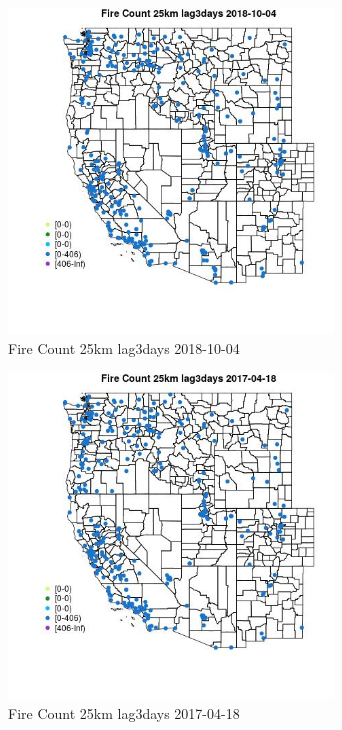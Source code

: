 \begin{figure} 
\centering  
\includegraphics[width=0.77\textwidth]{Code_Outputs/Report_ML_input_PM25_Step4_part_f_de_duplicated_aves_prioritize_24hr_obswNAs_MapObsFire_Count_25km_lag3days2018-10-04.jpg} 
\caption{\label{fig:Report_ML_input_PM25_Step4_part_f_de_duplicated_aves_prioritize_24hr_obswNAsMapObsFire_Count_25km_lag3days2018-10-04}Fire Count 25km lag3days 2018-10-04} 
\end{figure} 
 

\begin{figure} 
\centering  
\includegraphics[width=0.77\textwidth]{Code_Outputs/Report_ML_input_PM25_Step4_part_f_de_duplicated_aves_prioritize_24hr_obswNAs_MapObsFire_Count_25km_lag3days2017-04-18.jpg} 
\caption{\label{fig:Report_ML_input_PM25_Step4_part_f_de_duplicated_aves_prioritize_24hr_obswNAsMapObsFire_Count_25km_lag3days2017-04-18}Fire Count 25km lag3days 2017-04-18} 
\end{figure} 
 

